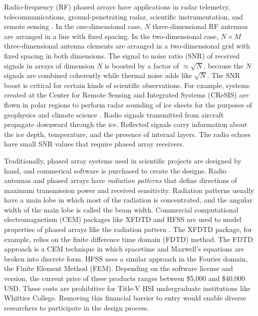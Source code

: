 \documentclass[../../main.tex]{subfiles}
\begin{document}
Radio-frequency (RF) phased arrays have applications in radar telemetry, telecommunications, ground-penetrating radar, scientific instrumentation, and remote sensing \cite{Vieregg_2016,AVVA201746,arnold_2020,PhysRevD.105.122006,10.3390/s21186091,10.1016/j.jappgeo.2022.104876,phased_array_book}.  In the one-dimensional case, $N$ three-dimensional RF antennas are arranged in a line with fixed spacing.  In the two-dimensional case, $N \times M$ three-dimensional antenna elements are arranged in a two-dimensional grid with fixed spacing in both dimensions.  The signal to noise ratio (SNR) of received signals in arrays of dimension $N$ is boosted by a factor of $\approx \sqrt{N}$, because the $N$ signals are combined coherently while thermal noise adds like $\sqrt{N}$.  The SNR boost is critical for certain kinds of scientific observations.  For example, systems created at the Center for Remote Sensing and Integrated Systems (CReSIS) are flown in polar regions to perform radar sounding of ice sheets for the purposes of geophysics and climate science \cite{arnold_2020}.  Radio signals transmitted from aircraft propagate downward through the ice.  Reflected signals carry information about the ice depth, temperature, and the presence of internal layers.  The radio echoes have small SNR values that require phased array receivers.  \\ \vspace{2.5mm}

Traditionally, phased array systems used in scientific projects are designed by hand, and commerical software is purchased to create the designs.  Radio antennas and phased arrays have \textit{radiation patterns} that define directions of maximum transmission power and received sensitivity.  Radiation patterns usually have a main lobe in which most of the radiation is concentrated, and the angular width of the main lobe is called the beam width.  Commercial computational electromagnetism (CEM) packages like XFDTD and HFSS are used to model properties of phased arrays like the radiation pattern \cite{remcom,ansys}.  The XFDTD package, for example, relies on the finite difference time domain (FDTD) method. The FDTD approach is a CEM technique in which spacetime and Maxwell’s equations are broken into discrete form.  HFSS uses a similar approach in the Fourier domain, the Finite Element Method (FEM).  Depending on the software license and version, the current price of these products ranges between \$5,000 and \$40,000 USD.  These costs are prohibitive for Title-V HSI undergraduate institutions like Whittier College.  Removing this financial barrier to entry would enable diverse researchers to participate in the design process. \\ \vspace{2.5mm}
\end{document}
